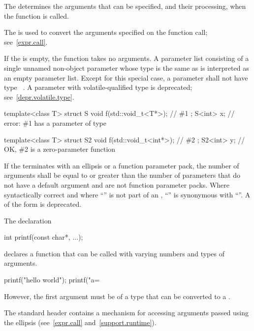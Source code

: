 \pnum
{}%
The
determines the arguments that can be specified, and their processing, when the function is called.
\begin{note}
%
The
is used to convert the arguments specified on the function call;
see~\ref{expr.call}.
\end{note}
%
If the
is empty, the function takes no arguments.
A parameter list consisting of a single unnamed non-object parameter
whose type is the same as 
is interpreted as an empty parameter list.
%
Except for this special case, a parameter shall not have type \cv{}~.
A parameter with volatile-qualified type is deprecated;
see~\ref{depr.volatile.type}.
\begin{example}
\begin{codeblock}
template<class T>
struct S {
  void f(std::void_t<T*>);      // \#1
};
S<int> x;                       // error: \#1 has a parameter of type 

template<class T>
struct S2 {
  void f(std::void_t<int*>);    // \#2
};
S2<int> y;                      // OK, \#2 is a zero-parameter function
\end{codeblock}
\end{example}

\pnum
If the
%
%
%
%
%
terminates with an ellipsis or a function parameter
pack, the number of arguments shall be equal
to or greater than the number of parameters that do not have a default
argument and are not function parameter packs.
Where syntactically correct and where ``'' is not
part of an ,
``''
is synonymous with
``''.
A 
of the form
 
is deprecated.
\begin{example}
The declaration
\begin{codeblock}
int printf(const char*, ...);
\end{codeblock}
declares a function that can be called with varying numbers and types of arguments.

\begin{codeblock}
printf("hello world");
printf("a=%
\end{codeblock}

However, the first argument must be of a type
that can be converted to a
.
\end{example}
\begin{note}
The standard header 
contains a mechanism for accessing arguments passed using the ellipsis
(see~\ref{expr.call} and~\ref{support.runtime}).
\end{note}

